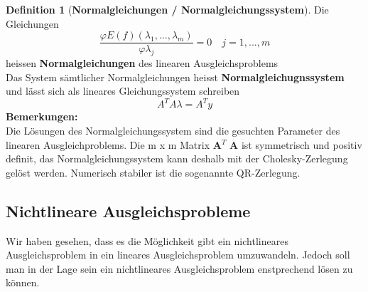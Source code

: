 \documentclass{article}
\theoremstyle{satz}
\theoremstyle{definition}
\newtheorem{definition}{Definition}
\begin{document}
\theoremstyle{definition}
\begin{tcolorbox}
\begin{definition}[\textbf{Normalgleichungen / Normalgleichungssystem}]
Die Gleichungen
\begin{equation}
\frac{\varphi E(f)(\lambda_1, ..., \lambda_m)}{\varphi \lambda_j} = 0 \quad j = 1, ..., m
\end{equation}
heissen \textbf{Normalgleichungen} des linearen Ausgleichsproblems\\
Das System sämtlicher Normalgleichungen heisst \textbf{Normalgleichugnssystem} und lässt sich als lineares Gleichungssystem schreiben
\begin{equation}
	A^T A \lambda = A^T y
\end{equation}
\textbf{Bemerkungen: }\\
Die Lösungen des Normalgleichungssystem sind die gesuchten Parameter des linearen Ausgleichproblems. Die m x m Matrix \textbf{A}$^T$ \textbf{A} ist symmetrisch und positiv definit, das Normalgleichungssystem kann deshalb mit der  Cholesky-Zerlegung gelöst werden. Numerisch stabiler ist die sogenannte QR-Zerlegung.
\end{definition}
\end{tcolorbox}

\subsection{Nichtlineare Ausgleichsprobleme}
Wir haben gesehen, dass es die Möglichkeit gibt ein nichtlineares Ausgleichsproblem in ein lineares Ausgleichsproblem umzuwandeln. Jedoch soll man in der Lage sein ein nichtlineares Ausgleichsproblem enstprechend lösen zu können.
\end{document}
